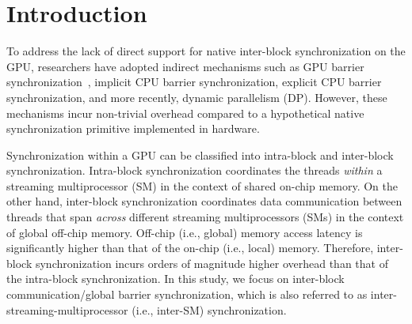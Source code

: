 \documentclass[conference]{IEEEtran}
\begin{document}
%
\IEEEpeerreviewmaketitle

\section{Introduction}
\label{sec:intro}

To address the lack of direct support for native inter-block synchronization on the GPU,
researchers have adopted indirect mechanisms such as GPU barrier synchronization~\cite{proc9}, implicit CPU barrier synchronization, explicit CPU barrier synchronization, and more recently, dynamic parallelism (DP). However, these mechanisms incur non-trivial overhead compared to a hypothetical native synchronization primitive implemented in hardware.

Synchronization within a GPU can be classified into intra-block and inter-block synchronization. Intra-block synchronization coordinates the threads \emph{within} a streaming multiprocessor (SM) in the context of shared on-chip memory.
On the other hand, inter-block synchronization coordinates data communication between threads that span \emph{across} different streaming multiprocessors (SMs) in the context of global off-chip memory. Off-chip (i.e., global) memory access latency is significantly higher than that of the on-chip (i.e., local) memory. Therefore, inter-block synchronization incurs orders of magnitude higher overhead than 
that of the intra-block synchronization. In this study, we focus on inter-block communication/global barrier synchronization, which is also referred to as inter-streaming-multiprocessor (i.e., inter-SM) synchronization.  
\end{document}

